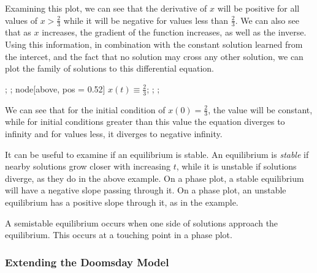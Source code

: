 \documentclass[12pt]{report}
\begin{document}
\begin{flushleft}
Examining this plot, we can see that the derivative of \(x\) will be
positive for all values of \(x > \frac{2}{3}\) while it will be negative
for values less than \(\frac{2}{3}\). We can also see that as \(x\) increases,
the gradient of the function increases, as well as the inverse. Using this
information, in combination with the constant solution learned from the
intercet, and the fact that no solution may cross any other solution,
we can plot the family of solutions to this differential equation.

\begin{plot}[
    xmin = -1,
    xmax = 0.5,
    ymin = -0.5,
    ymax = 2
]
    ;
    ;
    node[above, pos = 0.52] {\(x(t)\equiv\frac{2}{3}\)};
    ;
    ;
\end{plot}

We can see that for the initial condition of \(x(0) = \frac{2}{3}\), the value
will be constant, while for initial conditions greater than this value the
equation diverges to infinity and for values less, it diverges to negative
infinity. \par
It can be useful to examine if an equilibrium is stable. An equilibrium is
\textit{stable} if nearby solutions grow closer with increasing \(t\), while
it is unstable if solutions diverge, as they do in the above example. On a
phase plot, a stable equilibrium will have a negative slope passing through it.
On a phase plot, an unstable equilibrium has a positive slope through it,
as in the example. \par
A semistable equilibrium occurs when one side of solutions approach the
equilibrium. This occurs at a touching point in a phase plot.

\subsubsection*{Extending the Doomsday Model}


\end{flushleft}
\end{document}
